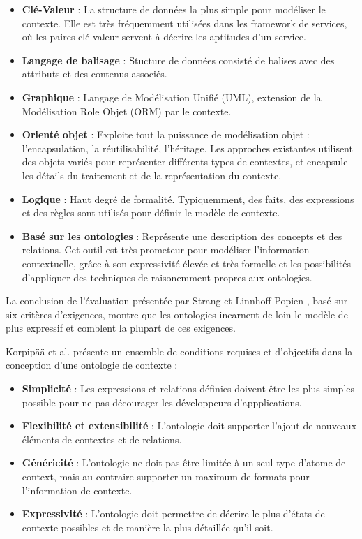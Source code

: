 \begin{itemize}
    \item \textbf{Clé-Valeur} : 
	    La structure de données la plus simple pour modéliser le contexte.
	    Elle est très fréquemment utilisées dans les framework de services,
	    où les paires clé-valeur servent à décrire les aptitudes d'un
	    service.
    \item \textbf{Langage de balisage} :
	    Stucture de données consisté de balises avec des attributs et des
	    contenus associés. 
    \item \textbf{Graphique} :
	    Langage de Modélisation Unifié (UML), extension de la Modélisation
	    Role Objet (ORM) par le contexte.
    \item \textbf{Orienté objet} :
	    Exploite tout la puissance de modélisation objet : l'encapsulation,
	    la réutilisabilité, l'héritage. Les approches existantes utilisent
	    des objets variés pour représenter différents types de contextes, et
	    encapsule les détails du traitement et de la représentation du
	    contexte.
    \item \textbf{Logique} :
	    Haut degré de formalité. Typiquemment, des faits, des expressions
	    et des règles sont utilisés pour définir le modèle de contexte.
    \item \textbf{Basé sur les ontologies} :
	    Représente une description des concepts et des relations. Cet outil
	    est très prometeur pour modéliser l'information contextuelle, grâce
	    à son expressivité élevée et très formelle et les possibilités
	    d'appliquer des techniques de raisonemment propres aux ontologies.
\end{itemize}

La conclusion de l'évaluation présentée par Strang et Linnhoff-Popien
\cite{strang_context_2004}, basé sur six critères d'exigences, montre que les
ontologies incarnent de loin le modèle de plus expressif et comblent la plupart
de ces exigences.

Korpipää et al. \cite{korpipaa_ontology_2003} présente un ensemble de conditions
requises et d'objectifs dans la conception d'une ontologie de contexte :

\begin{itemize}
    \item \textbf{Simplicité} : 
	    Les expressions et relations définies doivent être les plus simples
	    possible pour ne pas décourager les développeurs d'appplications.
    \item \textbf{Flexibilité et extensibilité} :
	    L'ontologie doit supporter l'ajout de nouveaux éléments de contextes
	    et de relations.
    \item \textbf{Généricité} :
	    L'ontologie ne doit pas être limitée à un seul type d'atome de
	    context, mais au contraire supporter un maximum de formats pour
	    l'information de contexte.
    \item \textbf{Expressivité} :
	    L'ontologie doit permettre de décrire le plus d'états de
	    contexte possibles et de manière la plus détaillée qu'il soit.
\end{itemize}


